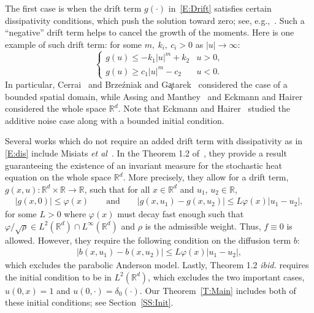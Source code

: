 \documentclass[a4paper,11pt]{article}%
\theoremstyle{plain}
\theoremstyle{definition}
\numberwithin{equation}{section}
\newcommand{\R}{\mathbb{R}}
\begin{document}
The first case is when the drift term $g(\cdot)$ in~\eqref{E:Drift} satisfies certain dissipativity
conditions, which push the solution toward zero; see, e.g.,~\cite{assing.manthey:03:invariant,
brzezniak.gatarek:99:martingale, cerrai:01:second, cerrai:03:stochastic,
eckmann.hairer:01:invariant}. Such a ``negative'' drift term helps to cancel the growth of the
moments. Here is one example of such drift term: for some $m,\: k_i, \: c_i>0$ as $|u| \to \infty$:
\begin{equation}\label{E:dis}
  \begin{cases}
    g(u) \le -k_1|u|^m + k_2 & u > 0, \\
    g(u) \ge c_1|u|^m - c_2  & u < 0.
  \end{cases}
\end{equation}
In particular, Cerrai~\cite{cerrai:01:second, cerrai:03:stochastic} and Brze\'{z}niak and
G\c{a}tarek~\cite{brzezniak.gatarek:99:martingale} considered the case of a bounded spatial domain,
while Assing and Manthey~\cite{assing.manthey:03:invariant} and Eckmann and
Hairer~\cite{eckmann.hairer:01:invariant} considered the whole space $\R^d$. Note that Eckmann and
Hairer~\cite{eckmann.hairer:01:invariant} studied the additive noise case along with a bounded
initial condition.

Several works which do not require an added drift term with dissipativity as in \eqref{E:dis}
include Misiats \textit{et
al}~\cite{misiats.stanzhytskyi.ea:16:existence,misiats.stanzhytskyi.ea:20:invariant}. In the Theorem
1.2 of~\cite{misiats.stanzhytskyi.ea:20:invariant}, they provide a result guaranteeing the existence
of an invariant measure for the stochastic heat equation on the whole space $\R^d$. More precisely,
they allow for a drift term, $g(x,u):\R^d \times \R \to \R$, such that for all $x \in \R^d$ and
$u_1$, $u_2 \in \R$,
\begin{align*}
		|g(x,0)| \le \varphi(x) \qquad \text{and} \qquad |g(x,u_1) - g(x,u_2)| \le L\varphi(x)|u_1 - u_2|,
\end{align*}
for some $L>0$ where $\varphi(x)$ must decay fast enough such that $\varphi / \sqrt{\rho} \in
L^2 (\R^d) \cap L^{\infty}(\R^d)$ and $\rho$ is the admissible weight. Thus, $f \equiv 0$ is allowed.
However, they require the following condition on the diffusion term $b$:
\begin{align*}
  |b(x,u_1) - b(x,u_2)| \le L\varphi(x)|u_1 - u_2|,
\end{align*}
which excludes the parabolic Anderson model. Lastly, Theorem 1.2 \textit{ibid.} requires the initial
condition to be in $L^2 (\R^d)$, which excludes the two important cases, $u(0,x) = 1$ and
$u(0,\cdot) = \delta_0(\cdot)$. Our Theorem~\ref{T:Main} includes both of these initial conditions;
see Section~\ref{SS:Init}.
\end{document}
